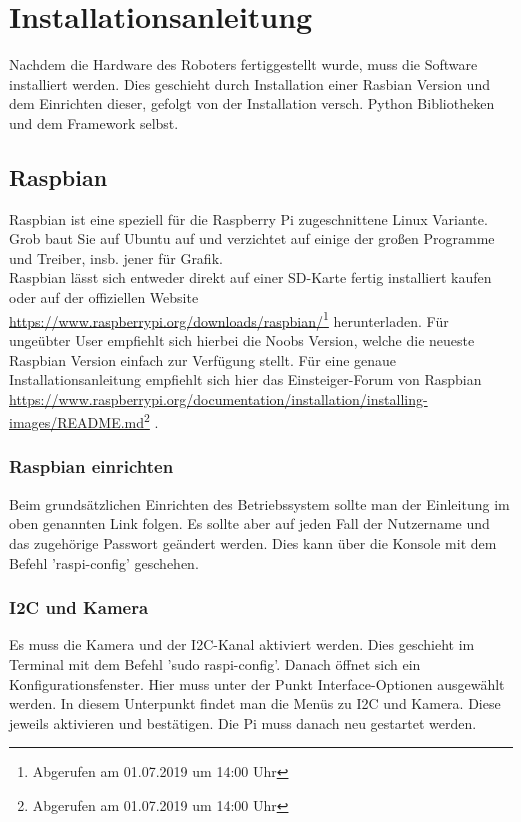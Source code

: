 \documentclass[a4paper,cleardoubleempty,BCOR1cm]{book}
\begin{document}
\chapter{Installationsanleitung}
Nachdem die Hardware des Roboters fertiggestellt wurde, muss die Software installiert werden. Dies geschieht durch Installation einer Rasbian Version und dem Einrichten dieser, gefolgt von der Installation versch. Python Bibliotheken und dem Framework selbst. 
\section{Raspbian}
Raspbian ist eine speziell für die Raspberry Pi zugeschnittene Linux Variante. Grob baut Sie auf Ubuntu auf und verzichtet auf einige der großen Programme und Treiber, insb. jener für Grafik. \\
Raspbian lässt sich entweder direkt auf einer SD-Karte fertig installiert kaufen oder auf der offiziellen Website\\ \url{https://www.raspberrypi.org/downloads/raspbian/}\footnote{Abgerufen am 01.07.2019 um 14:00 Uhr}
herunterladen. Für ungeübter User empfiehlt sich hierbei die Noobs Version, welche die neueste Raspbian Version einfach zur Verfügung stellt. Für eine genaue Installationsanleitung empfiehlt sich hier das Einsteiger-Forum von Raspbian \url{https://www.raspberrypi.org/documentation/installation/installing-images/README.md}\footnote{Abgerufen am 01.07.2019 um 14:00 Uhr}
.

\subsection{Raspbian einrichten}
Beim grundsätzlichen Einrichten des Betriebssystem sollte man der Einleitung im oben genannten Link folgen. Es sollte aber auf jeden Fall der Nutzername und das zugehörige Passwort geändert werden. Dies kann über die Konsole mit dem Befehl 'raspi-config' geschehen. \\

\subsection{I2C und Kamera}
Es muss die Kamera und der I2C-Kanal aktiviert werden. Dies geschieht im Terminal mit dem Befehl 'sudo raspi-config'. Danach öffnet sich ein Konfigurationsfenster. Hier muss unter der Punkt Interface-Optionen ausgewählt werden. In diesem Unterpunkt findet man die Menüs zu I2C und Kamera. Diese jeweils aktivieren und bestätigen. Die Pi muss danach neu gestartet werden. 
\end{document}
